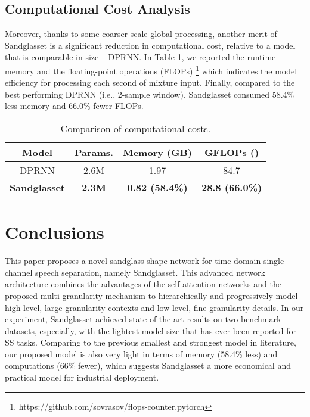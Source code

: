 \documentclass{article}
\begin{document}
\subsection{Computational Cost Analysis}
\label{sec:cost}
Moreover, thanks to some coarser-scale global processing, another merit of Sandglasset is a significant reduction in computational cost, relative to a model that is comparable in size -- DPRNN. In Table \ref{tab:3}, we reported the runtime memory and the floating-point operations (FLOPs) \footnote{https://github.com/sovrasov/flops-counter.pytorch} which indicates the model efficiency for processing each second of mixture input. Finally, compared to the best performing DPRNN (i.e., 2-sample window), Sandglasset consumed 58.4\% less memory and 66.0\% fewer FLOPs.
\begin{table}[t]
\caption{Comparison of computational costs.}
\label{tab:3}
\centering
\begin{tabular}{c|c|c|c}
\hline
\textbf{Model} & \textbf{Params.} & \textbf{Memory} (GB) & \textbf{GFLOPs} () \\
\hline
{DPRNN \cite{luo2019dual}} & 2.6M & 1.97 & 84.7  \\ 
{\bf{Sandglasset}} & \bf{2.3M} & \bf{0.82} (58.4\%)  & \bf{28.8} (66.0\%)  \\
\hline
\end{tabular}
\vspace{-3mm}
\end{table}
\section{Conclusions}
\label{sec:conc}
This paper proposes a novel sandglass-shape network for time-domain single-channel speech separation, namely Sandglasset. This advanced network architecture combines the advantages of the self-attention networks and the proposed multi-granularity mechanism to hierarchically and progressively model high-level, large-granularity contexts and low-level, fine-granularity details. In our experiment, Sandglasset achieved state-of-the-art results on two benchmark datasets, especially, with the lightest model size that has ever been reported for SS tasks. Comparing to the previous smallest and strongest model in literature, our proposed model is also very light in terms of memory (58.4\% less) and computations (66\% fewer), which suggests Sandglasset a more economical and practical model for industrial deployment.







\end{document}
